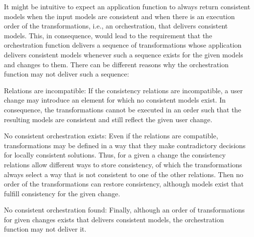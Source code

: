It might be intuitive to expect an application function to always return consistent models when the input models are consistent and when there is an execution order of the transformations, i.e., an orchestration, that delivers consistent models.
This, in consequence, would lead to the requirement that the orchestration function delivers a sequence of transformations whose application delivers consistent models whenever such a sequence exists for the given models and changes to them.
There can be different reasons why the orchestration function may not deliver such a sequence:
\begin{properdescription}
    \item[Relations are incompatible:] If the consistency relations are incompatible, a user change may introduce an element for which no consistent models exist. In consequence, the transformations cannot be executed in an order such that the resulting models are consistent and still reflect the given user change.
    \item[No consistent orchestration exists:] Even if the relations are compatible, transformations may be defined in a way that they make contradictory decisions for locally consistent solutions. Thus, for a given a change the consistency relations allow different ways to store consistency, of which the transformations always select a way that is not consistent to one of the other relations.
    Then no order of the transformations can restore consistency, although models exist that fulfill consistency for the given change.
    \item[No consistent orchestration found:] Finally, although an order of transformations for given changes exists that delivers consistent models, the orchestration function may not deliver it. 
\end{properdescription}

